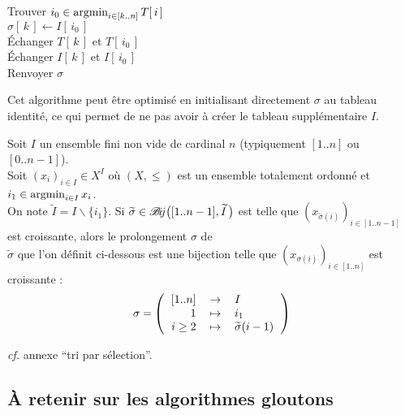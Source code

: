 		\begin{algocont}
			\Indp Trouver \( i_0 \in \operatorname*{argmin}_{i \in [k..n]} T[\, i \,] \) \\
			\( \sigma[\, k \,] \leftarrow I[\, i_0 \,] \) \\
			Échanger \( T[\, k \,] \) et \( T[\, i_0 \,] \) \\
			Échanger \( I[\, k \,] \) et \( I[\, i_0 \,] \) \\ \Indm
			Renvoyer \(\sigma\)
		\end{algocont}
		
		\begin{Remarque}
			Cet algorithme peut être optimisé en initialisant directement $\sigma$ au tableau identité, ce qui permet de ne pas avoir à créer le tableau supplémentaire $I$.
		\end{Remarque}
		
		\eqskip{2mm}
		\begin{Propriete}
			Soit $I$ un ensemble fini non  vide de cardinal $n$ (typiquement $[1..n]$ ou $[0..n-1]$). \\
			Soit $(x_i)_{i \in I} \in X^I$ où \( (X, \leq) \) est un ensemble totalement ordonné et \( i_1 \in \operatorname*{argmin}_{i \in I} x_i \). \\
			On note \( \widetilde{I} = I \backslash \{i_1\} \). \nt
			Si \( \widetilde{\sigma} \in \mathscr{B} \hspace{-0.5mm} i \! j \big( [1..n-1], \widetilde{I} \, \big) \) est telle que \( \left( x_{\widetilde{\sigma}(i)} \right)_{i \in [1..n-1]} \) est croissante, alors le prolongement \( \sigma \) de \\[-1.5mm] \( \widetilde{\sigma} \) que l'on définit ci-dessous est une bijection telle que \( \left( x_{\sigma(i)} \right)_{i \in [1..n]} \) est croissante :
				\setlength{\tabcolsep}{2.2pt}
					\[ 
						\sigma = \hspace{-0.2mm} \left( \begin{tabular}{rcl}
							\( [1..n] \) & \( \rightarrow \) & \( I \) \\
							1 & \( \mapsto \) & \( i_1 \) \\
							\( i \geq 2 \) & \( \mapsto \) & \( \widetilde{\sigma} (i-1) \)
						\end{tabular} \right)
					\]
		\end{Propriete}
		
		\begin{Preuve}
			\emph{cf.} annexe ``tri par sélection''.
		\end{Preuve}
		
	\subsection{À retenir sur les algorithmes gloutons}
		
